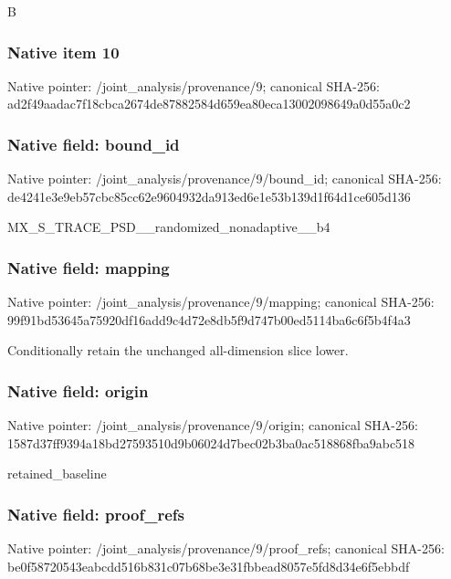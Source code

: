 \documentclass[10pt,a4paper]{article}
\begin{document}
\begingroup\raggedright\sloppy B\par\endgroup

\subsubsection{Native item 10}
Native pointer: /joint\_\allowbreak{}analysis/provenance/9; canonical SHA-256: ad2f49aadac7f18cbca2674de87882584d659ea80eca13002098649a0d55a0c2

\subsubsection{Native field: bound\_\allowbreak{}id}
Native pointer: /joint\_\allowbreak{}analysis/provenance/9/bound\_\allowbreak{}id; canonical SHA-256: de4241e3e9eb57cbc85cc62e9604932da913ed6e1e53b139d1f64d1ce605d136

\begingroup\raggedright\sloppy MX\_\allowbreak{}S\_\allowbreak{}TRACE\_\allowbreak{}PSD\_\allowbreak{}\_\allowbreak{}randomized\_\allowbreak{}nonadaptive\_\allowbreak{}\_\allowbreak{}b4\par\endgroup

\subsubsection{Native field: mapping}
Native pointer: /joint\_\allowbreak{}analysis/provenance/9/mapping; canonical SHA-256: 99f91bd53645a75920df16add9c4d72e8db5f9d747b00ed5114ba6c6f5b4f4a3

\begingroup\raggedright\sloppy Conditionally retain the unchanged all-dimension slice lower.\par\endgroup

\subsubsection{Native field: origin}
Native pointer: /joint\_\allowbreak{}analysis/provenance/9/origin; canonical SHA-256: 1587d37ff9394a18bd27593510d9b06024d7bec02b3ba0ac518868fba9abc518

\begingroup\raggedright\sloppy retained\_\allowbreak{}baseline\par\endgroup

\subsubsection{Native field: proof\_\allowbreak{}refs}
Native pointer: /joint\_\allowbreak{}analysis/provenance/9/proof\_\allowbreak{}refs; canonical SHA-256: be0f58720543eabcdd516b831c07b68be3e31fbbead8057e5fd8d34e6f5ebbdf
\end{document}
